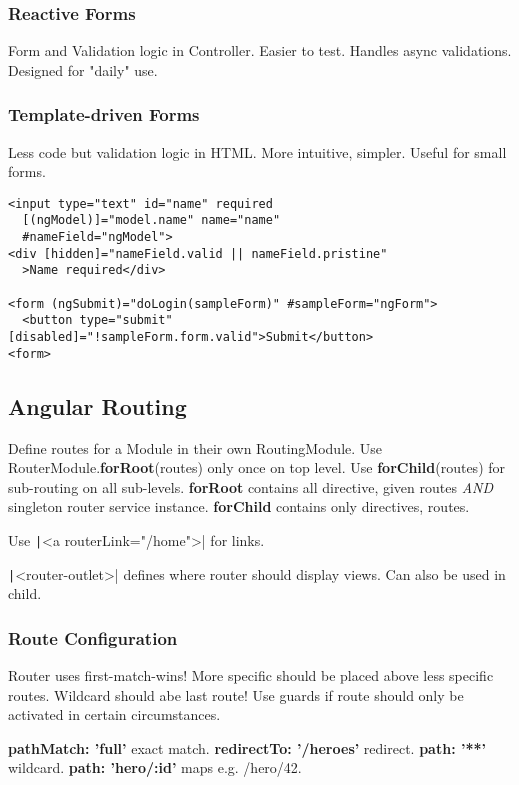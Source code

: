 \begin{multicols*}{2}
\subsubsection{Reactive Forms}
Form and Validation logic in Controller. Easier to test. Handles async validations. Designed for "daily" use.

\subsubsection{Template-driven Forms}
Less code but validation logic in HTML. More intuitive, simpler. Useful for small forms.

\begin{verbatim}
<input type="text" id="name" required
  [(ngModel)]="model.name" name="name"
  #nameField="ngModel">
<div [hidden]="nameField.valid || nameField.pristine"
  >Name required</div>

<form (ngSubmit)="doLogin(sampleForm)" #sampleForm="ngForm">
  <button type="submit" [disabled]="!sampleForm.form.valid">Submit</button>
<form>
\end{verbatim}

\subsection{Angular Routing}
Define routes for a Module in their own RoutingModule.
Use RouterModule.\textbf{forRoot}(routes) only once on top level. Use \textbf{forChild}(routes) for sub-routing on all sub-levels.
\textbf{forRoot} contains all directive, given routes \textit{AND} singleton router service instance. \textbf{forChild} contains only directives, routes.

Use \texttt|<a routerLink="/home">| for links.

\texttt|<router-outlet>| defines where router should display views.
Can also be used in child.

\subsubsection{Route Configuration}
Router uses first-match-wins! More specific should be placed above less specific routes. Wildcard should abe last route! Use guards if route should only be activated in certain circumstances.

\textbf{pathMatch: 'full'} exact match.
\textbf{redirectTo: '/heroes'} redirect.
\textbf{path: '**'} wildcard.
\textbf{path: 'hero/:id'} maps e.g. /hero/42.


\end{multicols*}
